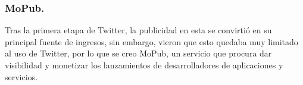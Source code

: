 \subsubsection{MoPub.}

Tras la primera etapa de Twitter, la publicidad en esta se convirtió en su principal fuente de ingresos, sin embargo, vieron que esto quedaba muy limitado al uso de Twitter, por lo que se creo MoPub, un servicio que procura dar visibilidad y monetizar los lanzamientos de desarrolladores de aplicaciones y servicios.